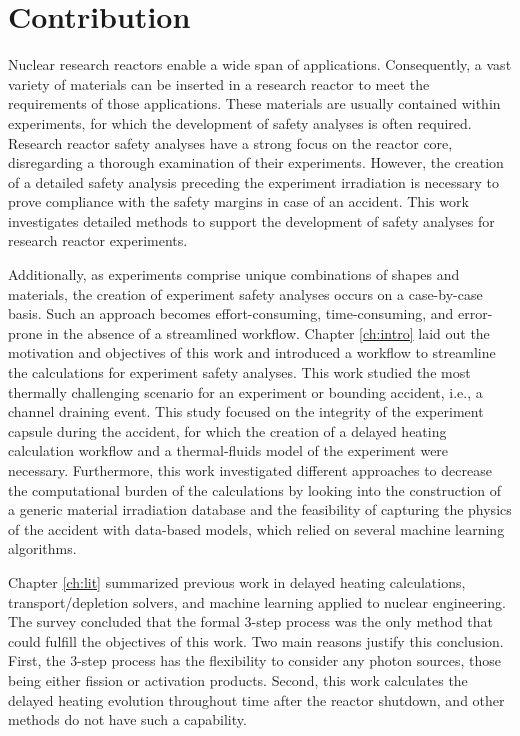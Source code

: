 \label{ch:concl}

\section{Contribution}

Nuclear research reactors enable a wide span of applications.
Consequently, a vast variety of materials can be inserted in a research reactor to meet the requirements of those applications.
These materials are usually contained within experiments, for which the development of safety analyses is often required.
Research reactor safety analyses have a strong focus on the reactor core, disregarding a thorough examination of their experiments.
However, the creation of a detailed safety analysis preceding the experiment irradiation is necessary to prove compliance with the safety margins in case of an accident.
This work investigates detailed methods to support the development of safety analyses for research reactor experiments.

Additionally, as experiments comprise unique combinations of shapes and materials, the creation of experiment safety analyses occurs on a case-by-case basis.
Such an approach becomes effort-consuming, time-consuming, and error-prone in the absence of a streamlined workflow.
Chapter \ref{ch:intro} laid out the motivation and objectives of this work and introduced a workflow to streamline the calculations for experiment safety analyses.
This work studied the most thermally challenging scenario for an experiment or bounding accident, i.e., a channel draining event.
This study focused on the integrity of the experiment capsule during the accident, for which the creation of a delayed heating calculation workflow and a thermal-fluids model of the experiment were necessary.
Furthermore, this work investigated different approaches to decrease the computational burden of the calculations by looking into the construction of a generic material irradiation database and the feasibility of capturing the physics of the accident with data-based models, which relied on several machine learning algorithms.


Chapter \ref{ch:lit} summarized previous work in delayed heating calculations, transport/depletion solvers, and machine learning applied to nuclear engineering.
The survey concluded that the formal 3-step process was the only method that could fulfill the objectives of this work.
Two main reasons justify this conclusion.
First, the 3-step process has the flexibility to consider any photon sources, those being either fission or activation products.
Second, this work calculates the delayed heating evolution throughout time after the reactor shutdown, and other methods do not have such a capability.

